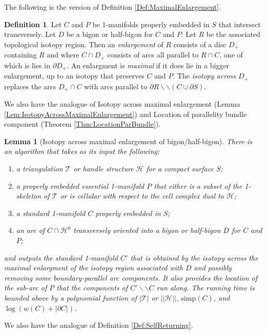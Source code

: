 \documentclass[oneside]{amsart}
\numberwithin{equation}{section}
\theoremstyle{plain}
\newtheorem{lemma}[equation]{Lemma}
\theoremstyle{definition}
\newtheorem{definition}[equation]{Definition}
\newcommand{\calT}{{\mathcal{T}}}
\newcommand{\cut}{\backslash\backslash}
\newcommand{\calH}{\mathcal{H}}
\begin{document}
The following is the version of Definition \ref{Def:MaximalEnlargement}.

\begin{definition}
\label{Def:MaximalEnlargementBigon}
Let $C$ and $P$ be 1-manifolds properly embedded in $S$ that intersect transversely. Let $D$ be a bigon or half-bigon for $C$ and $P$. Let $R$ be the associated topological isotopy region. Then an \emph{enlargement} of $R$ consists of a disc $D_+$ containing $R$ and where $C \cap D_+$ consists of arcs all parallel to $R \cap C$, one of which is lies in $\partial D_+$. An enlargment is \emph{maximal} if it does lie in a bigger enlargement, up to an isotopy that preserves $C$ and $P$.
The \emph{isotopy across $D_+$} replaces the arcs $D_+ \cap C$ with arcs  parallel to $\partial R \cut (C \cup \partial S)$.
\end{definition}


We also have the analogue of {\sc Isotopy across maximal enlargement} (Lemma \ref{Lem:IsotopyAcrossMaximalEnlargement}) and {\sc Location of parallelity bundle component} (Theorem \ref{Thm:LocationParBundle}).

\begin{lemma}[{\sc Isotopy across maximal enlargement of bigon/half-bigon}]
There is an algorithm that takes as its input the following:
\begin{enumerate}
\item a triangulation $\calT$ or handle structure $\calH$ for a compact surface $S$;
\item a properly embedded essential 1-manifold $P$ that either is a subset of the 1-skeleton of $\calT$ or is cellular with respect to the cell complex dual to $\calH$;
\item a standard 1-manifold $C$ properly embedded in $S$;
\item an arc of $C \cap \calH^0$ transversely oriented into a bigon or half-bigon $D$ for $C$ and $P$;
\end{enumerate}
and outputs the standard 1-manifold $C'$ that is obtained by the isotopy across the maximal enlargment of the isotopy region associated with $D$ and possibly removing some boundary-parallel arc components. It also provides the location of the sub-arc of $P$ that the components of $C' \cut C$ run along. The running time is bounded above by a polynomial function of $|\calT|$ or $||\calH||$, $\mathrm{simp}(C)$, and $\log (w(C) + |\partial C|)$.
\end{lemma}

We also have the analogue of Definition \ref{Def:SelfReturning}.
\end{document}
